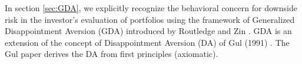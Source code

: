 \documentclass{article}
\newcommand{\1}[1]{
  \mathbf{1}_{\{#1\}}
}
\newcommand{\hot}{
  \text{h.o.t.}
}
\begin{document}
In section \ref{sec:GDA}, we explicitly recognize the behavioral
concern for downside risk in the investor's evaluation of portfolios
using the framework of Generalized Disappointment Aversion (GDA)
introduced by Routledge and Zin \cite{routledge2010generalized}. GDA
is an extension of the concept of Disappointment Aversion (DA) of Gul
(1991) \cite{gul1991theory}. The Gul paper derives the DA from first
principles (axiomatic).


\end{document}
